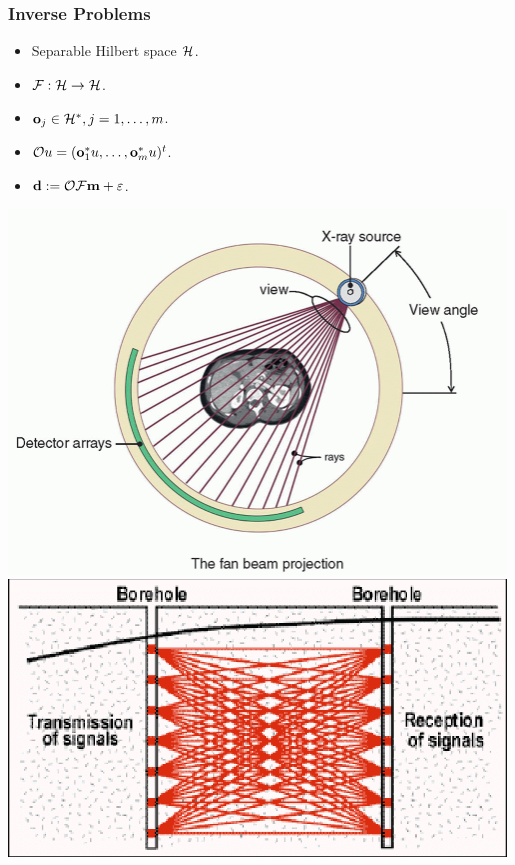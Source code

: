 \documentclass{beamer}
\begin{document}
\begin{frame}
\frametitle{Inverse Problems}

\begin{minipage}{0.5\textwidth}
  \begin{itemize}
    \item<1-> Separable Hilbert space $\mathcal{H}$.
    \item<2-> \(\mathcal{F}: \mathcal{H} \to \mathcal{H}\).
    \item<3-> \(\mathbf{o}_j \in \mathcal{H}^*, j=1,\dots,m \).
    \item<4-> \(\mathcal{O} u = (\mathbf{o}_1^*u, \dots, \mathbf{o}_m^*u )^t\).
    \item<5-> \(\mathbf{d} := \mathcal{O} \mathcal{F} \mathbf{m} + \varepsilon\).%
  \end{itemize}
\end{minipage}%
\begin{minipage}[t]{0.5\textwidth}
    \centering
    \includegraphics[width=0.99\textwidth]{CT.png}\\
    \vspace{0.5cm}
    \includegraphics[width=0.99\textwidth]{borehole.png}
\end{minipage}

\end{frame}
\end{document}
